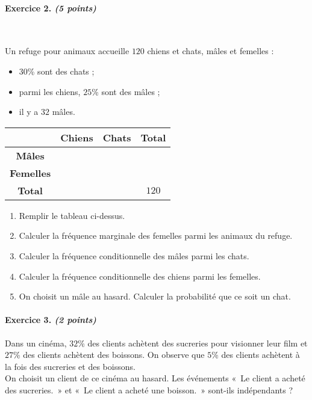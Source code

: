 \documentclass[11pt]{article}
\begin{document}
\paragraph{Exercice 2. \emph{(5 points)}}~\\
\begin{minipage}[]{.5\textwidth}
Un refuge pour animaux accueille $120$ chiens et chats, m\^ales et femelles :
\begin{itemize}
  \item $30$\% sont des chats ;
  \item parmi les chiens, $25$\% sont des m\^ales ;
  \item il y a $32$ m\^ales.
\end{itemize}
\end{minipage}
\begin{minipage}[]{.5\textwidth}
\begin{center}
\renewcommand{\arraystretch}{2}
\begin{tabular}{|c|c|c|c|}
  \cline{2-4}
  \multicolumn{1}{c|}{} & \textbf{Chiens} & \textbf{Chats} & \textbf{Total} \\ 
  \hline
  \textbf{M\^ales} & & & \\
  \hline
  \textbf{Femelles} & & & \\
  \hline
  \textbf{Total} & & & $120$ \\
  \hline
\end{tabular}
\end{center}
\end{minipage}
\begin{enumerate}
  \item Remplir le tableau ci-dessus.
  \item Calculer la fréquence marginale des femelles parmi les animaux du
    refuge.
  \item Calculer la fréquence conditionnelle des m\^ales parmi les chats.
  \item Calculer la fréquence conditionnelle des chiens parmi les femelles.
  \item On choisit un m\^ale au hasard. Calculer la probabilité que ce soit un
    chat.
\end{enumerate}

\paragraph{Exercice 3. \emph{(2 points)}}
Dans un cinéma, $32$\% des clients achètent des sucreries pour visionner leur
film et $27$\% des clients achètent des boissons. On observe que $5$\% des
clients achètent à la fois des sucreries et des boissons.\\
On choisit un client de ce cinéma au hasard. Les événements «~Le client a acheté
des sucreries.~» et «~Le client a acheté une boisson.~» sont-ils indépendants ?
\end{document}

